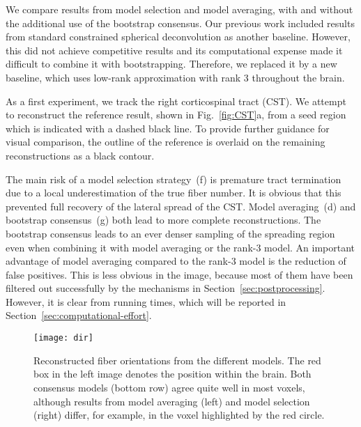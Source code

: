 We compare results from model selection and model averaging, with and without the additional use of the bootstrap consensus. Our previous work \cite{Gruen:2021} included results from standard constrained spherical deconvolution as another baseline. However, this did not achieve competitive results and its computational expense made it difficult to combine it with bootstrapping. Therefore, we replaced it by a new baseline, which uses low-rank approximation with rank 3 throughout the brain.

As a first experiment, we track the right corticospinal tract (CST). We attempt to reconstruct the reference result, shown in Fig.~\ref{fig:CST}a, from a seed
region which is indicated with a dashed black line. To provide further guidance for visual comparison, the outline of the reference is overlaid on the remaining reconstructions as a black contour.

The main risk of a model selection strategy~(f) is premature tract termination due to a local underestimation of the true fiber number. It is obvious that this prevented full recovery of the lateral spread of the CST. Model averaging~(d) and bootstrap consensus~(g) both lead to more complete reconstructions. The bootstrap consensus leads to an ever denser sampling of the spreading region even when combining it with model averaging or the rank-3 model. An important advantage of model averaging compared to the rank-3 model is the reduction of false positives. This is less obvious in the image, because most of them have been filtered out successfully by the mechanisms in Section~\ref{sec:postprocessing}. However, it is clear from running times, which will be reported in Section~\ref{sec:computational-effort}.

\begin{figure*}
	\centering
	\texttt{[image: dir]}
	\caption{Reconstructed fiber orientations from the different models. The
          red box in the left image denotes the position within the brain. Both consensus
          models (bottom row) agree quite well in most voxels, although results from model averaging (left) and model selection (right) differ, for example, in the voxel highlighted by the red circle.}
	\label{fig:directions}
\end{figure*}

